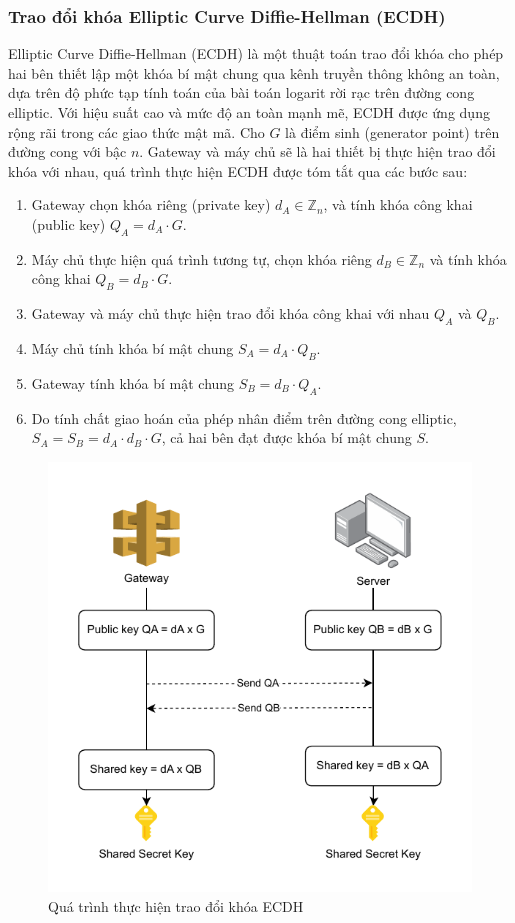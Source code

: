 \subsubsection{Trao đổi khóa Elliptic Curve Diffie-Hellman (ECDH)}
\label{sec:ecdh}
Elliptic Curve Diffie-Hellman (ECDH) là một thuật toán trao đổi khóa cho phép hai bên thiết lập một khóa bí mật chung qua kênh truyền thông không an toàn, dựa trên độ phức tạp tính toán của bài toán logarit rời rạc trên đường cong elliptic. Với hiệu suất cao và mức độ an toàn mạnh mẽ, ECDH được ứng dụng rộng rãi trong các giao thức mật mã. Cho \( G \) là điểm sinh (generator point) trên đường cong với bậc \( n \). Gateway và máy chủ sẽ là hai thiết bị thực hiện trao đổi khóa với nhau, quá trình thực hiện ECDH được tóm tắt qua các bước sau:
\begin{enumerate}
    \item Gateway chọn khóa riêng (private key) \( d_A \in \mathbb{Z}_n \), và tính khóa công khai (public key) \( Q_A = d_A \cdot G \).
    \item Máy chủ thực hiện quá trình tương tự, chọn khóa riêng  \( d_B \in \mathbb{Z}_n \) và tính khóa công khai \( Q_B = d_B \cdot G \).
    \item Gateway và máy chủ thực hiện trao đổi khóa công khai với nhau \( Q_A \) và \( Q_B \).
    \item Máy chủ tính khóa bí mật chung \( S_A = d_A \cdot Q_B \).
    \item Gateway tính khóa bí mật chung  \( S_B = d_B \cdot Q_A \).
    \item Do tính chất giao hoán của phép nhân điểm trên đường cong elliptic, \( S_A = S_B = d_A \cdot d_B \cdot G \), cả hai bên đạt được khóa bí mật chung \( S \).
\end{enumerate}
\begin{figure}[h]
    \centering
    \includegraphics[width=0.65\linewidth]{images/keyexchange.pdf}
    \caption{Quá trình thực hiện trao đổi khóa ECDH}
    \label{fig:curve}
\end{figure}


